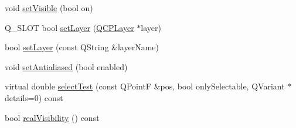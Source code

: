 \begin{DoxyCompactItemize}
\item 
void \hyperlink{classQCPLayerable_a3bed99ddc396b48ce3ebfdc0418744f8}{set\+Visible} (bool on)
\item 
Q\+\_\+\+S\+L\+OT bool \hyperlink{classQCPLayerable_ab0d0da6d2de45a118886d2c8e16d5a54}{set\+Layer} (\hyperlink{classQCPLayer}{Q\+C\+P\+Layer} $\ast$layer)
\item 
bool \hyperlink{classQCPLayerable_ab25a0e7b897993b44447caee0f142083}{set\+Layer} (const Q\+String \&layer\+Name)
\item 
void \hyperlink{classQCPLayerable_a4fd43e89be4a553ead41652565ff0581}{set\+Antialiased} (bool enabled)
\item 
virtual double \hyperlink{classQCPLayerable_a4001c4d0dfec55598efa4d531f2179a9}{select\+Test} (const Q\+PointF \&pos, bool only\+Selectable, Q\+Variant $\ast$details=0) const 
\item 
bool \hyperlink{classQCPLayerable_a30809f7455e9794bca7b6c737622fa63}{real\+Visibility} () const 
\end{DoxyCompactItemize}
